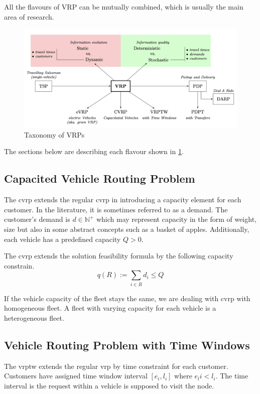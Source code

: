 All the flavours of \gls{VRP} can be mutually combined, which is usually the main area of research.

    \begin{figure}[ht]
        \centering
        \includegraphics[width=1.0\textwidth]{resources/intro/vrp-flavours.png}
        \caption{Taxonomy of VRPs \cite{bono-stochastic-vrp}}
        \label{fig:vrp-flavours}
    \end{figure}

The sections below are describing each flavour shown in \ref{fig:vrp-flavours}.

    \subsection{Capacited Vehicle Routing Problem}
    The \gls{cvrp} extends the regular \gls{cvrp} in introducing a capacity element for each customer. In the literature, it is sometimes referred to as a demand. The customer's demand is $d \in \mathbb{N}^+$ which may represent capacity in the form of weight, size but also in some abstract concepts such as a basket of apples. Additionally, each vehicle has a predefined capacity $Q > 0$.
    
    The \gls{cvrp} extends the solution feasibility formula by the following capacity constrain.
    \begin{equation}
        q(R) := \sum_{i \in R} d_i \leq Q
    \end{equation}
    
    If the vehicle capacity of the fleet stays the same, we are dealing with \gls{cvrp} with homogeneous fleet. A fleet with varying capacity for each vehicle is a heterogeneous fleet.
    
    \subsection{Vehicle Routing Problem with Time Windows}
    The \gls{vrptw} extends the regular \gls{vrp} by time constraint for each customer. Customers have assigned time window interval $[e_i, l_i]$ where $e_li < l_i$. The time interval is the request within a vehicle is supposed to visit the node. 
    
